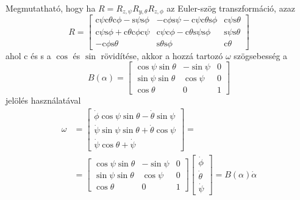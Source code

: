 \documentclass[12pt,a4paper]{report}
\theoremstyle{remark}
\theoremstyle{definition}
\begin{document}
Megmutatható, hogy ha $R = R_{z, \psi} R_{y, \theta} R_{z, \phi}$ az Euler-szög transzformáció, azaz
\begin{equation}
R = \begin{bmatrix}
\mathrm{c}\psi \mathrm{c}\theta \mathrm{c}\phi - \mathrm{s}\psi \mathrm{s}\phi &  -\mathrm{c}\phi \mathrm{s}\psi - 
    \mathrm{c}\psi \mathrm{c}\theta \mathrm{s}\phi & \mathrm{c}\psi \mathrm{s}\theta \\
\mathrm{c}\psi \mathrm{s}\phi + \mathrm{c}\theta \mathrm{c}\phi \mathrm{c}\psi & \mathrm{c}\psi \mathrm{c}\phi - 
    \mathrm{c}\theta \mathrm{s}\psi \mathrm{s}\phi & \mathrm{s}\psi \mathrm{s}\theta \\
-\mathrm{c}\phi \mathrm{s}\theta & \mathrm{s}\theta \mathrm{s}\phi & \mathrm{c}\theta 
\end{bmatrix}
\end{equation}
ahol c és s a $\cos$ és $\sin$ rövidítése, akkor a hozzá tartozó $\omega$ szögsebesség a
\begin{equation} \label{eq:represent}
B(\alpha) = 
    \begin{bmatrix}
    \cos \psi \sin \theta & -\sin \psi & 0 \\ 
    \sin \psi \sin \theta & \cos \psi & 0 \\ 
    \cos \theta & 0 & 1
    \end{bmatrix} 
\end{equation}
jelölés használatával
\begin{equation}
\begin{aligned}
\omega &=
    \begin{bmatrix}
    \dot{\phi} \cos \psi \sin \theta - \dot{\theta} \sin \psi \\ 
    \dot{\psi} \sin \psi \sin \theta + \dot{\theta} \cos \psi \\ 
    \dot{\psi} \cos \theta + \dot{\psi}
    \end{bmatrix} = \\
&= \begin{bmatrix}
    \cos \psi \sin \theta & -\sin \psi & 0 \\ 
    \sin \psi \sin \theta & \cos \psi & 0 \\ 
    \cos \theta & 0 & 1
    \end{bmatrix} 
    \begin{bmatrix}
    \dot{\phi} \\ 
    \dot{\theta} \\ 
    \dot{\psi}
    \end{bmatrix} = B(\alpha)\dot{\alpha}
\end{aligned}
\end{equation}
\end{document}
